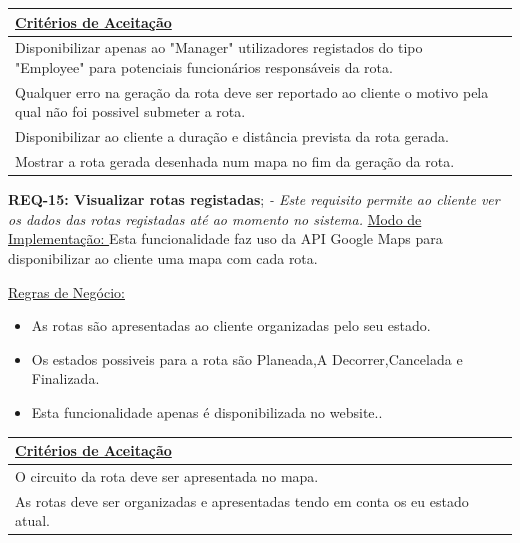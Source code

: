 \documentclass{scrreprt}
\begin{document}
		\begin{tabular}{|p{5.8in}|p{0.7in}|} \hline 
		\underline{Critérios de Aceitação} \\ \hline 
		Disponibilizar apenas ao "Manager" utilizadores registados do tipo "Employee" para potenciais funcionários responsáveis da rota.\\ \hline
		Qualquer erro na geração da rota deve ser reportado ao cliente o motivo pela qual não foi possivel submeter a rota.\\ \hline
		Disponibilizar ao cliente a duração e distância prevista da rota gerada. \\ \hline
		Mostrar a rota gerada desenhada num mapa no fim da geração da rota. \\ \hline
	\end{tabular}\newline\newline
	
		\textbf{REQ-15: Visualizar rotas registadas};\newline
	\textit{- Este requisito permite ao cliente ver os dados das rotas registadas até ao momento no sistema.}
	 \newline\newline
		\underline{Modo de Implementação: }Esta funcionalidade faz uso da API Google Maps para disponibilizar ao cliente uma mapa com cada rota.  \newline\newline
		
		\underline{Regras de Negócio: } 
		\begin{itemize}
		\item As rotas são apresentadas ao cliente organizadas pelo seu estado.
		\item Os estados possiveis para a rota são Planeada,A Decorrer,Cancelada e Finalizada.
	    \item  Esta funcionalidade apenas é disponibilizada no website..
	\end{itemize}
	
		\begin{tabular}{|p{5.8in}|p{0.7in}|} \hline 
		\underline{Critérios de Aceitação} \\ \hline 
		O circuito da rota deve ser apresentada no mapa.\\ \hline
		As rotas deve ser organizadas e apresentadas tendo em conta os eu estado atual.\\ \hline
	\end{tabular}\newline\newline
	
\end{document}
